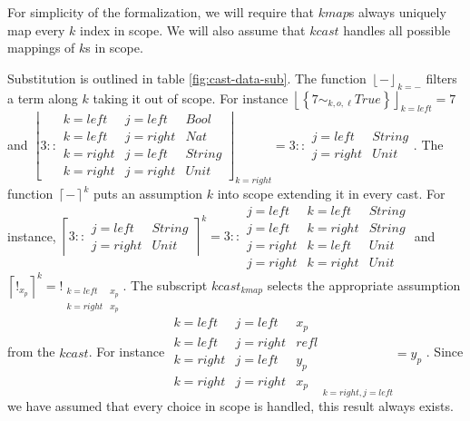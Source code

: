 For simplicity of the formalization, we will require that $kmap$s
always uniquely map every $k$ index in scope. We will also assume
that $kcast$ handles all possible mappings of $k$s in scope.

Substitution is outlined in table \ref{fig:cast-data-sub}. The function
$\left\lfloor -\right\rfloor _{k=-}$ filters a term along $k$ taking
it out of scope. For instance $\left\lfloor \left\{ 7\sim_{k,o,\ell}True\right\} \right\rfloor _{k=left}=7$
and $\left\lfloor 3::\begin{array}{ccc}
k=left & j=left & Bool\\
k=left & j=right & Nat\\
k=right & j=left & String\\
k=right & j=right & Unit
\end{array}\right\rfloor _{k=right}=3::\begin{array}{cc}
j=left & String\\
j=right & Unit
\end{array}$. The function $\left\lceil -\right\rceil ^{k}$ puts an assumption
$k$ into scope extending it in every cast. For instance, $\left\lceil 3::\begin{array}{cc}
j=left & String\\
j=right & Unit
\end{array}\right\rceil ^{k}=3::\begin{array}{ccc}
j=left & k=left & String\\
j=left & k=right & String\\
j=right & k=left & Unit\\
j=right & k=right & Unit
\end{array}$ and $\left\lceil !_{x_{p}}\right\rceil ^{k}=!_{\begin{array}{cc}
k=left & x_{p}\\
k=right & x_{p}
\end{array}}$. The subscript $kcast_{kmap}$ selects the appropriate assumption
from the $kcast$. For instance $\begin{array}{ccc}
k=left & j=left & x_{p}\\
k=left & j=right & refl\\
k=right & j=left & y_{p}\\
k=right & j=right & x_{p}
\end{array}_{k=right,j=left}=y_{p}$ . Since we have assumed that every choice in scope is handled, this
result always exists.

